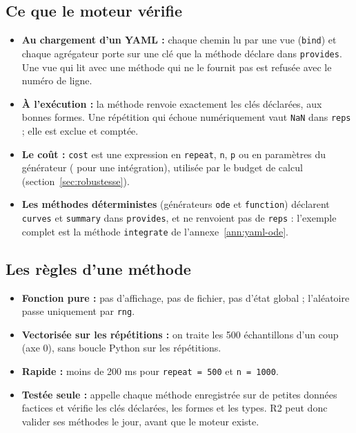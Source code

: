 \documentclass[11pt,a4paper]{article}
\begin{document}
\begin{appendices}
\subsection{Ce que le moteur vérifie}
\begin{itemize}[leftmargin=*, nosep]
  \item \textbf{Au chargement d'un YAML :} chaque chemin lu par une vue (\texttt{bind}) et chaque agrégateur porte sur une clé que la méthode déclare dans \texttt{provides}. Une vue qui lit  avec une méthode qui ne le fournit pas est refusée avec le numéro de ligne.
  \item \textbf{À l'exécution :} la méthode renvoie exactement les clés déclarées, aux bonnes formes. Une répétition qui échoue numériquement vaut \texttt{NaN} dans \texttt{reps} ; elle est exclue et comptée.
  \item \textbf{Le coût :} \texttt{cost} est une expression en \texttt{repeat}, \texttt{n}, \texttt{p} ou en paramètres du générateur ( pour une intégration), utilisée par le budget de calcul (section~\ref{sec:robustesse}).
  \item \textbf{Les méthodes déterministes} (générateurs \texttt{ode} et \texttt{function}) déclarent \texttt{curves} et \texttt{summary} dans \texttt{provides}, et ne renvoient pas de \texttt{reps} : l'exemple complet est la méthode \texttt{integrate} de l'annexe~\ref{ann:yaml-ode}.
\end{itemize}

\subsection{Les règles d'une méthode}
\begin{itemize}[leftmargin=*, nosep]
  \item \textbf{Fonction pure :} pas d'affichage, pas de fichier, pas d'état global ; l'aléatoire passe uniquement par \texttt{rng}.
  \item \textbf{Vectorisée sur les répétitions :} on traite les 500 échantillons d'un coup (axe 0), sans boucle Python sur les répétitions.
  \item \textbf{Rapide :} moins de 200 ms pour \texttt{repeat = 500} et \texttt{n = 1000}.
  \item \textbf{Testée seule :}  appelle chaque méthode enregistrée sur de petites données factices et vérifie les clés déclarées, les formes et les types. R2 peut donc valider ses méthodes le jour, avant que le moteur existe.
\end{itemize}


\end{appendices}
\end{document}
